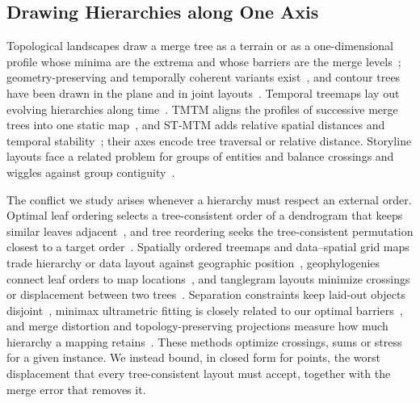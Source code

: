 \subsection{Drawing Hierarchies along One Axis}
Topological landscapes draw a merge tree as a terrain or as a one-dimensional profile whose minima are the extrema and whose barriers are the merge levels~\cite{Weber:2007:TL,Oesterling:2013:TLP}; geometry-preserving and temporally coherent variants exist~\cite{Beketayev:2012:GPTL,Herick:2020:TCTL}, and contour trees have been drawn in the plane and in joint layouts~\cite{Heine:2011:DCT,Lohfink:2020:FCT}. Temporal treemaps lay out evolving hierarchies along time~\cite{Koepp:2019:TT}. TMTM aligns the profiles of successive merge trees into one static map~\cite{Koepp:2023:TMTM}, and ST-MTM adds relative spatial distances and temporal stability~\cite{STMTM:2026}; their axes encode tree traversal or relative distance. Storyline layouts face a related problem for groups of entities and balance crossings and wiggles against group contiguity~\cite{Tanahashi:2012:Storyline,Liu:2013:SF}.

The conflict we study arises whenever a hierarchy must respect an external order. Optimal leaf ordering selects a tree-consistent order of a dendrogram that keeps similar leaves adjacent~\cite{BarJoseph:2001:OLO,Eisen:1998:CA}, and tree reordering seeks the tree-consistent permutation closest to a target order~\cite{Bulteau:2022:RT}. Spatially ordered treemaps and data--spatial grid maps trade hierarchy or data layout against geographic position~\cite{Wood:2008:SOT,vanBeusekom:2023:DSL}, geophylogenies connect leaf orders to map locations~\cite{Klawitter:2025:GP}, and tanglegram layouts minimize crossings or displacement between two trees~\cite{Fernau:2010:CTC,Huson:2026:DOT}. Separation constraints keep laid-out objects disjoint~\cite{Dwyer:2006:IPSEP,Li:2019:SOI}, minimax ultrametric fitting is closely related to our optimal barriers~\cite{Farach:1995:RM}, and merge distortion and topology-preserving projections measure how much hierarchy a mapping retains~\cite{Eldridge:2015:MD,Doraiswamy:2021:TM}. These methods optimize crossings, sums or stress for a given instance. We instead bound, in closed form for points, the worst displacement that every tree-consistent layout must accept, together with the merge error that removes it.
